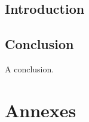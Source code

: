 \documentclass[11pt]{report}
\begin{document}
\newpage
\tableofcontents
\thispagestyle{empty}

\chapter{Introduction}

\newpage

%
%
%
%

\chapter{Conclusion}

A conclusion.

\newpage
{}
\part*{Annexes}

\newpage
\listoffigures
\end{document}
